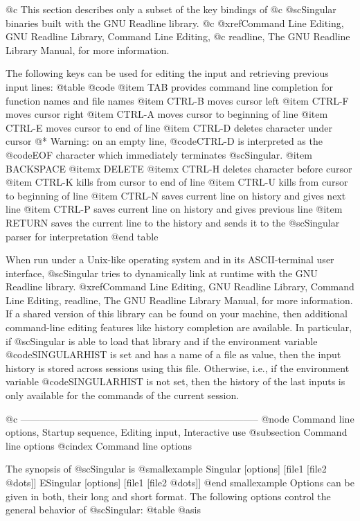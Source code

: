 @c This section describes only a subset of the key bindings of
@c @sc{Singular} binaries built with the GNU Readline library.
@c @xref{Command Line Editing, GNU Readline Library, Command Line Editing,
@c readline, The GNU Readline Library Manual}, for more information.

The following keys can be used for editing the input and retrieving
previous input lines:
@table @code
@item TAB
provides command line completion for function names and file names
@item CTRL-B
moves cursor left
@item CTRL-F
moves cursor right
@item CTRL-A
moves cursor to beginning of line
@item CTRL-E
moves cursor to end of line
@item CTRL-D
deletes character under cursor
@* Warning: on an empty line, @code{CTRL-D} is interpreted as the
@code{EOF} character which immediately terminates @sc{Singular}.
@item BACKSPACE
@itemx DELETE
@itemx CTRL-H
deletes character before cursor
@item CTRL-K
kills from cursor to end of line
@item CTRL-U
kills from cursor to beginning of line
@item CTRL-N
saves current line on history and gives next line
@item CTRL-P
saves current line on history and gives previous line
@item RETURN
saves the current line to the history and
sends it to the @sc{Singular} parser for interpretation
@end table

When run under a Unix-like operating system and in its ASCII-terminal
user interface,   @sc{Singular} tries to dynamically link at runtime
with the GNU Readline library. @xref{Command Line Editing, GNU Readline
Library, Command Line Editing, readline, The GNU Readline Library
Manual}, for more information. If a shared version of this library can
be found on your machine, then additional command-line editing
features like  history completion are available.
In particular, if @sc{Singular} is able to load that library and
if the environment
variable @code{SINGULARHIST} is set and has a name of a file as value,
then the input history is stored across sessions using this
file. Otherwise, i.e., if the environment variable @code{SINGULARHIST}
is not set, then the history of the last inputs is only available for
the commands of the current session.

@c --------------------------------------------------------------------------
@node Command line options, Startup sequence, Editing input, Interactive use
@subsection Command line options
@cindex Command line options

The synopsis of @sc{Singular} is
@smallexample
Singular  [options] [file1 [file2 @dots{}]]
ESingular  [options] [file1 [file2 @dots{}]]
@end smallexample
Options can be given in both, their long and short format. The following
options control the general behavior of @sc{Singular}:
@table @asis

